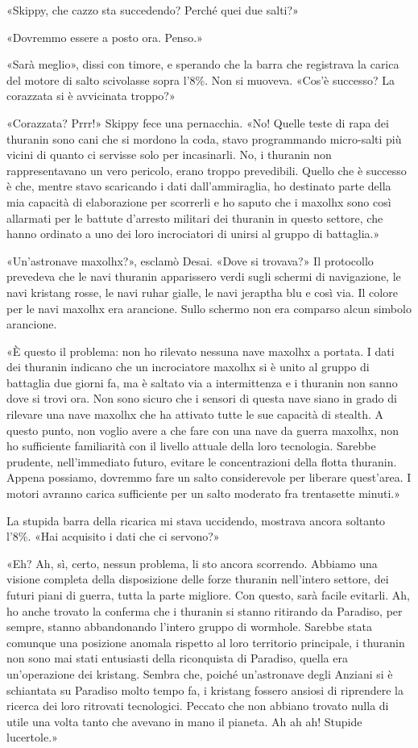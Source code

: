 «Skippy, che cazzo sta succedendo? Perché quei due salti?»

«Dovremmo essere a posto ora. Penso.»

«Sarà meglio», dissi con timore, e sperando che la barra che registrava
la carica del motore di salto scivolasse sopra l'8\%. Non si muoveva.
«Cos'è successo? La corazzata si è avvicinata troppo?»

«Corazzata? Prrr!» Skippy fece una pernacchia. «No! Quelle teste di rapa
dei thuranin sono cani che si mordono la coda, stavo programmando
micro-salti più vicini di quanto ci servisse solo per incasinarli. No, i
thuranin non rappresentavano un vero pericolo, erano troppo prevedibili.
Quello che è successo è che, mentre stavo scaricando i dati
dall'ammiraglia, ho destinato parte della mia capacità di elaborazione
per scorrerli e ho saputo che i maxolhx sono così allarmati per le
battute d'arresto militari dei thuranin in questo settore, che hanno
ordinato a uno dei loro incrociatori di unirsi al gruppo di battaglia.»

«Un'astronave maxolhx?», esclamò Desai. «Dove si trovava?» Il protocollo
prevedeva che le navi thuranin apparissero verdi sugli schermi di
navigazione, le navi kristang rosse, le navi ruhar gialle, le navi
jeraptha blu e così via. Il colore per le navi maxolhx era arancione.
Sullo schermo non era comparso alcun simbolo arancione.

«È questo il problema: non ho rilevato nessuna nave maxolhx a portata. I
dati dei thuranin indicano che un incrociatore maxolhx si è unito al
gruppo di battaglia due giorni fa, ma è saltato via a intermittenza e i
thuranin non sanno dove si trovi ora. Non sono sicuro che i sensori di
questa nave siano in grado di rilevare una nave maxolhx che ha attivato
tutte le sue capacità di stealth. A questo punto, non voglio avere a che
fare con una nave da guerra maxolhx, non ho sufficiente familiarità con
il livello attuale della loro tecnologia. Sarebbe prudente,
nell'immediato futuro, evitare le concentrazioni della flotta thuranin.
Appena possiamo, dovremmo fare un salto considerevole per liberare
quest'area. I motori avranno carica sufficiente per un salto moderato
fra trentasette minuti.»

La stupida barra della ricarica mi stava uccidendo, mostrava ancora
soltanto l'8\%. «Hai acquisito i dati che ci servono?»

«Eh? Ah, sì, certo, nessun problema, li sto ancora scorrendo. Abbiamo
una visione completa della disposizione delle forze thuranin nell'intero
settore, dei futuri piani di guerra, tutta la parte migliore. Con
questo, sarà facile evitarli. Ah, ho anche trovato la conferma che i
thuranin si stanno ritirando da Paradiso, per sempre, stanno
abbandonando l'intero gruppo di wormhole. Sarebbe stata comunque una
posizione anomala rispetto al loro territorio principale, i thuranin non
sono mai stati entusiasti della riconquista di Paradiso, quella era
un'operazione dei kristang. Sembra che, poiché un'astronave degli
Anziani si è schiantata su Paradiso molto tempo fa, i kristang fossero
ansiosi di riprendere la ricerca dei loro ritrovati tecnologici. Peccato
che non abbiano trovato nulla di utile una volta tanto che avevano in
mano il pianeta. Ah ah ah! Stupide lucertole.»

